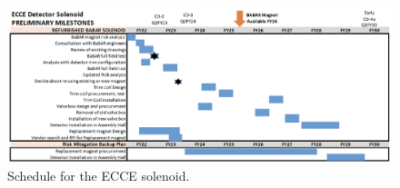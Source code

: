 \begin{figure}[h!tbp]
    \centering
    \includegraphics[width=1.0\textwidth]{figs/BaBar-Timeline.png}
    \caption{Schedule for the ECCE solenoid.}
    \label{fig:magnet_schedule}
\end{figure}